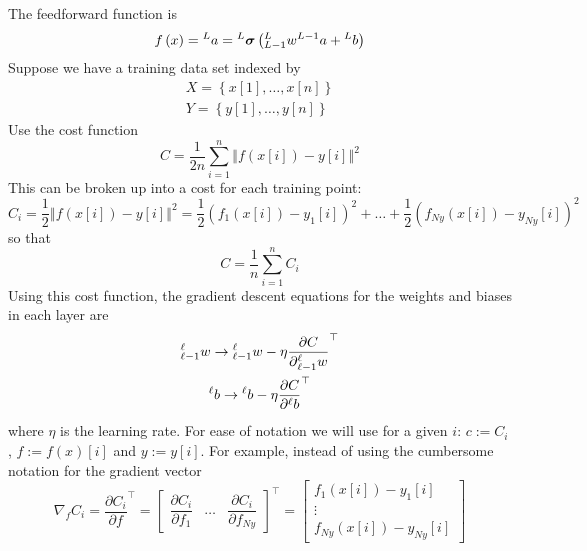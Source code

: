 \documentclass[11pt]{report} %
\begin{document}
The feedforward function is
\begin{equation}
f\left(x\right)=\mathstrut^{L}a=\mathstrut^{L}\boldsymbol{\sigma}\left(\mathstrut_{L-1}^{L}w\mathstrut^{L-1}a+\mathstrut^{L}b\right)
\end{equation}
Suppose we have a training data set indexed by
\begin{gather}
X=\left\{ x\left[1\right],\dots,x\left[n\right]\right\} \\
Y=\left\{ y\left[1\right],\dots,y\left[n\right]\right\} 
\end{gather}
Use the cost function
\begin{equation}
C=\dfrac{1}{2n}\sum_{i=1}^{n}\left\Vert f\left(x\left[i\right]\right)-y\left[i\right]\right\Vert ^{2}
\end{equation}
This can be broken up into a cost for each training point:
\begin{equation}
C_{i}=\dfrac{1}{2}\left\Vert f\left(x\left[i\right]\right)-y\left[i\right]\right\Vert ^{2}=\dfrac{1}{2}\left(f_{1}\left(x\left[i\right]\right)-y_{1}\left[i\right]\right)^{2}+\dots+\dfrac{1}{2}\left(f_{Ny}\left(x\left[i\right]\right)-y_{Ny}\left[i\right]\right)^{2}
\end{equation}
so that
\begin{equation}
C=\dfrac{1}{n}\sum_{i=1}^{n}C_{i}
\end{equation}
Using this cost function, the gradient descent equations for the weights and biases in each layer are
\begin{gather}
\mathstrut_{\ell-1}^{\ell}w\rightarrow\mathstrut_{\ell-1}^{\ell}w-\eta\dfrac{\partial C}{\partial\mathstrut_{\ell-1}^{\ell}w}^{\top} \\
\mathstrut^{\ell}b\rightarrow\mathstrut^{\ell}b-\eta\dfrac{\partial C}{\partial\mathstrut^{\ell}b}^{\top}
\end{gather}
where $\eta$ is the learning rate. For ease of notation we will use for a given $i$: $c := C_{i}$, $f := f\left(x\right)\left[i\right]$ and $y:= y\left[i\right]$. For example, instead of using the cumbersome notation for the gradient vector
\begin{equation}
\nabla_{f}C_{i}=\dfrac{\partial C_{i}}{\partial f}^{\top}=\begin{bmatrix}\dfrac{\partial C_{i}}{\partial f_{1}} & \dots & \dfrac{\partial C_{i}}{\partial f_{Ny}}\end{bmatrix}^{\top}=\begin{bmatrix}f_{1}\left(x\left[i\right]\right)-y_{1}\left[i\right]\\
\vdots\\
f_{Ny}\left(x\left[i\right]\right)-y_{Ny}\left[i\right]
\end{bmatrix}
\end{equation}
\end{document}
